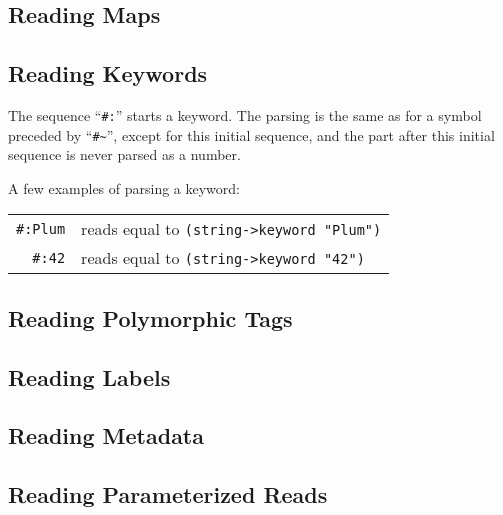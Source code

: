 \subsection{Reading Maps}
\label{subsec:aml-base-lang-reader-maps}





\subsection{Reading Keywords}
\label{subsec:aml-base-lang-reader-keywords}

The sequence ``\lstinline!#:!'' starts a keyword. The parsing is the same as for a symbol preceded by ``\lstinline!#~!'', except for this initial sequence, and the part after this initial sequence is never parsed as a number. 

\example A few examples of parsing a keyword:

\begin{tabular}{ r l }
  \lstinline!#:Plum! & reads equal to \lstinline!(string->keyword "Plum")! \\
  \lstinline!#:42! & reads equal to \lstinline!(string->keyword "42")! \\
\end{tabular}







\subsection{Reading Polymorphic Tags}
\label{subsec:aml-base-lang-reader-polytags}





\subsection{Reading Labels}
\label{subsec:aml-base-lang-reader-labels}





\subsection{Reading Metadata}
\label{subsec:aml-base-lang-reader-metadata}





\subsection{Reading Parameterized Reads}
\label{subsec:aml-base-lang-reader-parameterized-reads}





